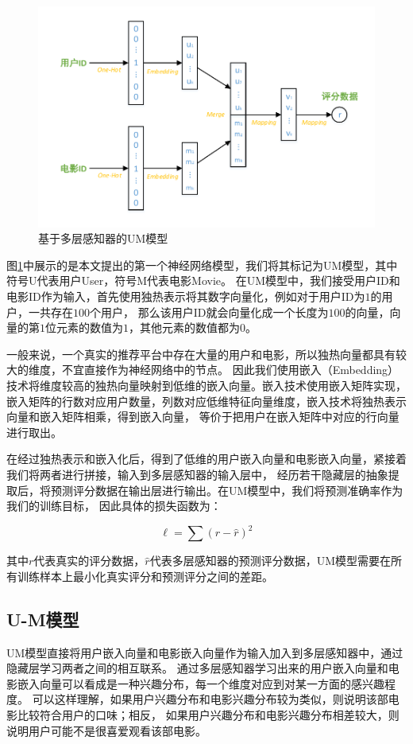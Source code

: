 \begin{figure}[htbp]
\centering
\includegraphics[scale=0.7]{images/a_b.pdf}
\caption{基于多层感知器的UM模型}
\label{fig:a_b}
\end{figure}

图\ref{fig:a_b}中展示的是本文提出的第一个神经网络模型，我们将其标记为UM模型，其中符号U代表用户User，符号M代表电影Movie。
在UM模型中，我们接受用户ID和电影ID作为输入，首先使用独热表示将其数字向量化，例如对于用户ID为$1$的用户，一共存在$100$个用户，
那么该用户ID就会向量化成一个长度为$100$的向量，向量的第$1$位元素的数值为$1$，其他元素的数值都为$0$。

一般来说，一个真实的推荐平台中存在大量的用户和电影，所以独热向量都具有较大的维度，不宜直接作为神经网络中的节点。
因此我们使用嵌入（Embedding）技术将维度较高的独热向量映射到低维的嵌入向量。嵌入技术使用嵌入矩阵实现，
嵌入矩阵的行数对应用户数量，列数对应低维特征向量维度，嵌入技术将独热表示向量和嵌入矩阵相乘，得到嵌入向量，
等价于把用户在嵌入矩阵中对应的行向量进行取出。

在经过独热表示和嵌入化后，得到了低维的用户嵌入向量和电影嵌入向量，紧接着我们将两者进行拼接，输入到多层感知器的输入层中，
经历若干隐藏层的抽象提取后，将预测评分数据在输出层进行输出。在UM模型中，我们将预测准确率作为我们的训练目标，
因此具体的损失函数为：

\begin{equation}
\ell = \sum{ (r - \hat{r})^2 }
\end{equation}

其中$r$代表真实的评分数据，$\hat{r}$代表多层感知器的预测评分数据，UM模型需要在所有训练样本上最小化真实评分和预测评分之间的差距。

\subsection{U-M模型}
UM模型直接将用户嵌入向量和电影嵌入向量作为输入加入到多层感知器中，通过隐藏层学习两者之间的相互联系。
通过多层感知器学习出来的用户嵌入向量和电影嵌入向量可以看成是一种兴趣分布，每一个维度对应到对某一方面的感兴趣程度。
可以这样理解，如果用户兴趣分布和电影兴趣分布较为类似，则说明该部电影比较符合用户的口味；相反，
如果用户兴趣分布和电影兴趣分布相差较大，则说明用户可能不是很喜爱观看该部电影。

